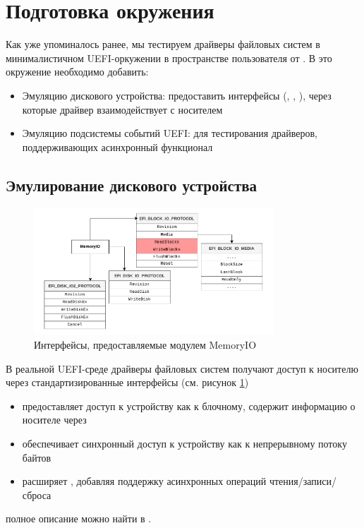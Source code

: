 \section{Подготовка окружения}
Как уже упоминалось ранее, мы тестируем драйверы файловых систем в минималистичном UEFI-оркужении в пространстве пользователя от \cite{OpenCorePkg}. В это окружение необходимо добавить:
\begin{itemize}
	\item Эмуляцию дискового устройства: предоставить интерфейсы (, , ), через которые драйвер взаимодействует с носителем
	
	\item Эмуляцию подсистемы событий UEFI: для тестирования драйверов, поддерживающих асинхронный функционал 
\end{itemize} 

\subsection{Эмулирование дискового устройства}
\begin{figure}[htbp]
	\centering %
	\includegraphics[width=0.8\textwidth]{MemoryIo.pdf} %
	\caption{Интерфейсы, предоставляемые модулем MemoryIO} %
	\label{env:pic:memoryio} %
\end{figure}

В реальной UEFI-среде драйверы файловых систем получают доступ к носителю через стандартизированные интерфейсы (см. рисунок \ref{env:pic:memoryio})
\begin{itemize}
	\item {} предоставляет доступ к устройству как к блочному, содержит информацию о носителе через 	
	\item {} обеспечивает синхронный доступ к устройству как к непрерывному потоку байтов
	
	\item {} расширяет , добавляя поддержку асинхронных операций чтения/записи/сброса
\end{itemize}
полное описание можно найти в \cite{UEFISpec}.



